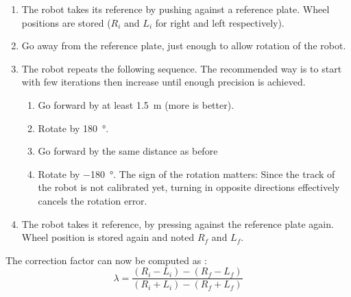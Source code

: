 \documentclass[a4paper]{IEEEtran}
\begin{document}
\begin{enumerate}
    \item The robot takes its reference by pushing against a reference plate.
        Wheel positions are stored ($R_i$ and $L_i$ for right and left respectively).
    \item Go away from the reference plate, just enough to allow rotation of the robot.
    \item The robot repeats the following sequence.
        The recommended way is to start with few iterations then increase until enough precision is achieved.
        \begin{enumerate}
            \item Go forward by at least \SI{1.5}{\meter} (more is better).
            \item Rotate by \SI{180}{\degree}.
            \item Go forward by the same distance as before
            \item Rotate by \SI{-180}{\degree}.
                The sign of the rotation matters:
                Since the track of the robot is not calibrated yet, turning in opposite directions effectively cancels the rotation error.
        \end{enumerate}
    \item The robot takes it reference, by pressing against the reference plate again.
        Wheel position is stored again and noted $R_f$ and $L_f$.
\end{enumerate}

The correction factor can now be computed as :
\begin{equation}
    \lambda = \frac{(R_i - L_i) - (R_f - L_f)}{(R_i + L_i) - (R_f + L_f)}
\end{equation}
\end{document}
